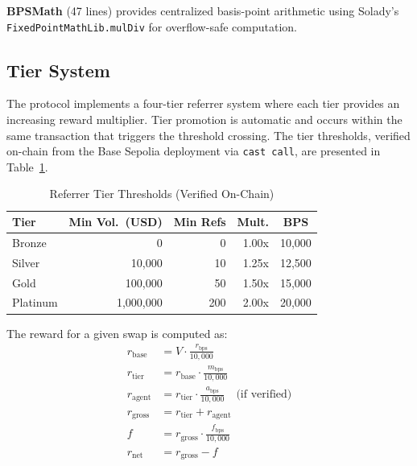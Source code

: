 \documentclass[conference]{IEEEtran}
\begin{document}
\textbf{BPSMath} (47 lines) provides centralized basis-point arithmetic using Solady's~\cite{solady} \texttt{Fixed\-Point\-Math\-Lib.mul\-Div} for overflow-safe computation.

\subsection{Tier System}
\label{sec:impl:tier}

The protocol implements a four-tier referrer system where each tier provides an increasing reward multiplier. Tier promotion is automatic and occurs within the same transaction that triggers the threshold crossing. The tier thresholds, verified on-chain from the Base Sepolia deployment via \texttt{cast call}, are presented in Table~\ref{tab:tiers}.

\begin{table}[t]
\caption{Referrer Tier Thresholds (Verified On-Chain)}
\label{tab:tiers}
\centering
\begin{tabular}{lrrrc}
\toprule
\textbf{Tier} & \textbf{Min Vol.\ (USD)} & \textbf{Min Refs} & \textbf{Mult.} & \textbf{BPS} \\
\midrule
Bronze & 0 & 0 & 1.00x & 10,000 \\
Silver & 10,000 & 10 & 1.25x & 12,500 \\
Gold & 100,000 & 50 & 1.50x & 15,000 \\
Platinum & 1,000,000 & 200 & 2.00x & 20,000 \\
\bottomrule
\end{tabular}
\end{table}

The reward for a given swap is computed as:
\begin{align}
r_{\text{base}} &= V \cdot \frac{r_{\text{bps}}}{10{,}000} \label{eq:base-reward} \\
r_{\text{tier}} &= r_{\text{base}} \cdot \frac{m_{\text{bps}}}{10{,}000} \label{eq:tier-reward} \\
r_{\text{agent}} &= r_{\text{tier}} \cdot \frac{a_{\text{bps}}}{10{,}000} \quad \text{(if verified)} \label{eq:agent-reward} \\
r_{\text{gross}} &= r_{\text{tier}} + r_{\text{agent}} \label{eq:gross-reward} \\
f &= r_{\text{gross}} \cdot \frac{f_{\text{bps}}}{10{,}000} \label{eq:fee} \\
r_{\text{net}} &= r_{\text{gross}} - f \label{eq:net-reward}
\end{align}
\end{document}
